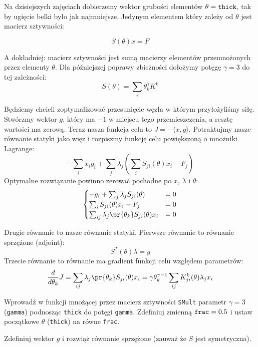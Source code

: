 \documentclass{instrukcja}
\begin{document}
\author{Ł. Łaniewski-Wołłk}
\materialtitle

Na dzisiejszych zajęciach dobierzemy wektor grubości elementów $\theta=\text{\tt thick}$, tak by ugięcie belki było jak najmniejsze. Jedynym elementem który zależy od $\theta$ jest macierz sztywności:

\[S(\theta)x = F\]

A dokładniej: macierz sztywności jest sumą macierzy elementów przemnożonych przez elementy $\theta$. Dla późniejszej poprawy zbieżności dołożymy potęgę $\gamma=3$ do tej zależności:
\[S(\theta) = \sum_i\theta_k^\gamma K^k\]

Będziemy chcieli zoptymalizować przesunięcie węzła w którym przyłożyliśmy siłę. Stwórzmy wektor $g$, który ma $-1$ w miejscu tego przemieszczenia, a resztę wartości ma zerową. Teraz nasza funkcja celu to $J = -\langle x, g \rangle$. Potraktujmy nasze równanie statyki jako więz i rozpiszmy funkcję celu powiększoną o mnożniki Lagrange:
\[-\sum_i x_i g_i  + \sum_j\lambda_j (\sum_iS_{ji}(\theta)x_i - F_j)\]
Optymalne rozwiązanie powinno zerować pochodne po $x$, $\lambda$ i $\theta$:
\[\begin{cases}
-g_i + \sum_j\lambda_j S_{ji} (\theta) &= 0\\
\sum_i S_{ji}(\theta)x_i - F_j &= 0\\
\sum_{ij}\lambda_j \pr{\theta_k}S_{ji}(\theta)x_i &= 0
\end{cases}\]

Drugie równanie to nasze równanie statyki. Pierwsze równanie to równanie sprzężone (adjoint):
\[S^T(\theta)\lambda = g\]
Trzecie równanie to równanie ma gradient funkcji celu względem parametrów:
\[\frac{d}{d\theta_k}J = \sum_{ij}\lambda_j \pr{\theta_k}S_{ji}(\theta)x_i = \gamma\theta_k^{\gamma-1}\sum_{ij}K^k_{ji}(\theta)\lambda_jx_i\]

\begin{zad}
Wprowadź w funkcji mnożącej przez macierz sztywności {\tt SMult} parametr $\gamma=3$ ({\tt gamma}) podnosząc {\tt thick} do potęgi {\tt gamma}. Zdefiniuj zmienną $\text{\tt frac} = 0.5$ i ustaw początkowe $\theta$ ({\tt thick}) na równe {\tt frac}. 
\end{zad}

\begin{zad}
Zdefiniuj wektor $g$ i rozwiąż równanie sprzężone (zauważ że $S$ jest symetryczna).
\end{zad}
\end{document}
